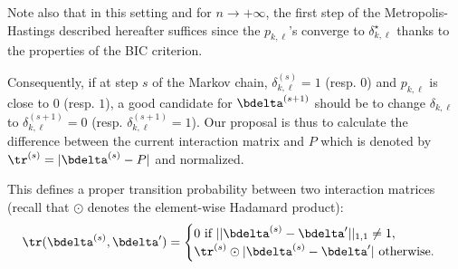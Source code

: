 Note also that in this setting and for $n \to +\infty$, the first step of the Metropolis-Hastings described hereafter suffices since the $p_{k,\ell}$'s converge to $\delta_{k,\ell}^\star$ thanks to the properties of the BIC criterion.

Consequently, if at step $s$ of the Markov chain, $\delta_{k,\ell}^{(s)} = 1$ (resp. $0$) and $p_{k,\ell}$ is close to $0$ (resp. $1$), a good candidate for $\bdelta^{(s+1)}$ should be to change $\delta_{k,\ell}$ to $\delta_{k,\ell}^{(s+1)} = 0$ (resp. $\delta_{k,\ell}^{(s+1)} = 1$). Our proposal is thus to calculate the difference between the current interaction matrix and $P$ which is denoted by $\tr^{(s)} = |\bdelta^{(s)} - P|$ and normalized.

This defines a proper transition probability between two interaction matrices (recall that $\odot$ denotes the element-wise Hadamard product):
\[ \tr(\bdelta^{(s)},\bdelta') = \begin{cases} 0 \text{ if } ||\bdelta^{(s)} - \bdelta'||_{1,1} \neq 1, \\ \tr^{(s)} \odot |\bdelta^{(s)} - \bdelta'| \text{ otherwise}. \end{cases} \]

